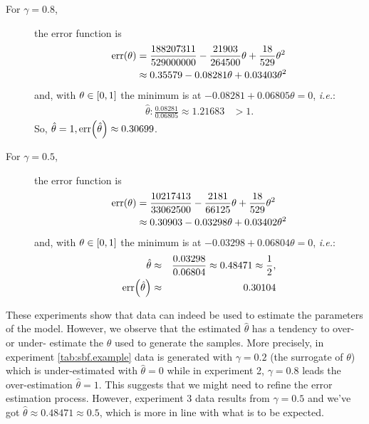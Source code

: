 \documentclass{tlp}
\newcommand{\at}[1]{\ensuremath{\!\del{#1}}}        %
\newcommand{\err}[1]{\ensuremath{\mathrm{err}\at{#1}}}
\begin{document}
\begin{description}
    \item[For \(\gamma=0.8\),] the error function is \begin{align*}
              \err{\theta} & = \frac{188207311}{529000000} - \frac{21903}{264500} \theta + \frac{18}{529} \theta^{2} \\
                           & \approx 0.35579 - 0.08281 \theta + 0.03403 \theta ^2\end{align*}
          and, with \(\theta\in\intcc{0, 1}\) the minimum is at $-0.08281 +
              0.06805 \theta = 0$, \emph{i.e.}:
          \begin{eqnarray*}
              \hat{\theta} : \frac{0.08281}{0.06805} \approx 1.21683& >1.
          \end{eqnarray*}
          So, \(\hat{\theta} = 1, \err{\hat{\theta}} \approx  0.30699\).

    \item[For \(\gamma=0.5\),] the error function is \begin{align*}
              \err{\theta} & = \frac{10217413}{33062500} - \frac{2181}{66125} \theta + \frac{18}{529} \theta^{2} \\
                           & \approx 0.30903 - 0.03298 \theta + 0.03402 \theta ^2\end{align*}
          and, with \(\theta\in\intcc{0, 1}\) the minimum is at $-0.03298 +
              0.06804 \theta = 0$, \emph{i.e.}:
          \begin{eqnarray*}
              \hat{\theta}        &\approx &
              \frac{0.03298}{0.06804}
              \approx 0.48471 \approx \frac{1}{2}, \\
              \err{\hat{\theta}}  &\approx & 0.30104 \end{eqnarray*}

\end{description}

These experiments show that data can indeed be used to estimate the
parameters of the model.  However, we observe that the estimated
\(\hat{\theta}\) has a tendency to over- or under- estimate the
\(\theta\) used to generate the samples.  More precisely, in
experiment \ref{tab:sbf.example} data is generated with
\(\gamma = 0.2\) (the surrogate of \(\theta\)) which is
under-estimated with \(\hat{\theta} = 0\) while in experiment 2,
\(\gamma = 0.8\) leads the over-estimation \(\hat{\theta} = 1\).  This
suggests that we might need to refine the error estimation process.
However, experiment 3 data results from $\gamma = 0.5$ and we've got
\(\hat{\theta} \approx 0.48471 \approx 0.5\), which is more in line
with what is to be expected.
%
%
%
\end{document}
